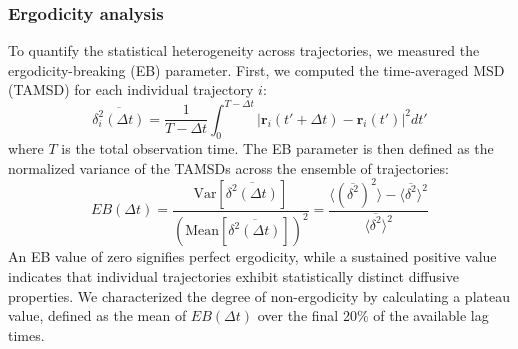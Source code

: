 \documentclass[]{article}
\begin{document}
\subsubsection{Ergodicity analysis}
To quantify the statistical heterogeneity across trajectories, we measured the ergodicity-breaking (EB) parameter. First, we computed the time-averaged MSD (TAMSD) for each individual trajectory $i$:
\begin{equation}
\overline{\delta_i^2(\Delta t)} = \frac{1}{T-\Delta t} \int_0^{T-\Delta t} |\mathbf{r}_i(t'+\Delta t) - \mathbf{r}_i(t')|^2 dt'
\end{equation}
where $T$ is the total observation time. The EB parameter is then defined as the normalized variance of the TAMSDs across the ensemble of trajectories:
\begin{equation}
EB(\Delta t) = \frac{\text{Var}[\overline{\delta^2(\Delta t)}]}{(\text{Mean}[\overline{\delta^2(\Delta t)}])^2} = \frac{\langle (\overline{\delta^2})^2 \rangle - \langle \overline{\delta^2} \rangle^2}{\langle \overline{\delta^2} \rangle^2}
\end{equation}
An EB value of zero signifies perfect ergodicity, while a sustained positive value indicates that individual trajectories exhibit statistically distinct diffusive properties. We characterized the degree of non-ergodicity by calculating a plateau value, defined as the mean of $EB(\Delta t)$ over the final 20\% of the available lag times.
\end{document}
